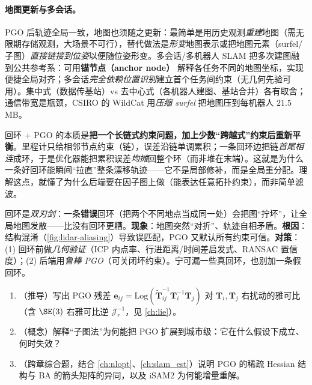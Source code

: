\paragraph{地图更新与多会话。}
PGO 后轨迹全局一致，地图也须随之更新\cite{carlone2026handbook}：最简单是用历史观测\emph{重建}地图（需无限期存储观测，大场景不可行），替代做法是\emph{形变}地图表示或把地图元素（surfel/子图）\emph{直接链接到位姿}以便随位姿形变。多会话/多机器人 SLAM 把多次建图融到公共参考系：可用\textbf{锚节点（anchor node）}\cite{kim2010multiple} 解释各任务不同的地图坐标，实现便捷全局对齐；多会话\emph{完全依赖位置识别}建立首个任务间约束（无几何先验可用）。集中式（数据传基站）vs 去中心式（各机器人建图、基站合并）各有取舍；通信带宽是瓶颈，CSIRO 的 WildCat 用\emph{压缩 surfel} 把地图压到每机器人 $21.5$\,MB。

\begin{insight}
回环 + PGO 的本质是\textbf{把一个长链式约束问题，加上少数“跨越式”约束后重新平衡}。里程计只给相邻节点约束（链），误差沿链单调累积；一条回环边把链\emph{首尾相连}成环，于是优化器能把累积误差\emph{均摊}回整个环（而非堆在末端）。这就是为什么一条好回环能瞬间“拉直”整条漂移轨迹——它不是局部修补，而是全局重分配。理解这点，就懂了为什么后端要在因子图上做（能表达任意拓扑约束），而非简单滤波。
\end{insight}

\begin{pitfall}
回环是\emph{双刃剑}：一条\textbf{错误}回环（把两个不同地点当成同一处）会把图“拧坏”，让全局地图发散——比没有回环更糟。\textbf{现象}：地图突然“对折”、轨迹自相矛盾。\textbf{根因}：结构混淆（\cref{fig:lidar-aliasing}）导致误匹配，PGO 又默认所有约束可信。\textbf{对策}：(1) 回环前做\emph{几何验证}（ICP 内点率、行进距离/时间差启发式、RANSAC 置信度）；(2) 后端用\emph{鲁棒 PGO}（可关闭坏约束）。宁可漏一些真回环，也别加一条假回环。
\end{pitfall}

\begin{practice}
\begin{enumerate}
  \item （推导）写出 PGO 残差 $\mathbf{e}_{ij}=\mathrm{Log}(\tilde{\mathbf{T}}_{ij}^{-1}\mathbf{T}_i^{-1}\mathbf{T}_j)$ 对 $\mathbf{T}_i,\mathbf{T}_j$ 右扰动的雅可比（含 $\SE(3)$ 右雅可比逆 $\boldsymbol{\mathcal{J}}_r^{-1}$，见 \cref{ch:lie}）。
  \item （概念）解释“子图法”为何能把 PGO 扩展到城市级：它在什么假设下成立、何时失效？
  \item （跨章综合题，结合 \cref{ch:nlopt}、\cref{ch:slam_est}）说明 PGO 的稀疏 Hessian 结构与 BA 的箭头矩阵的异同，以及 iSAM2 为何能增量重解。
\end{enumerate}
\end{practice}

